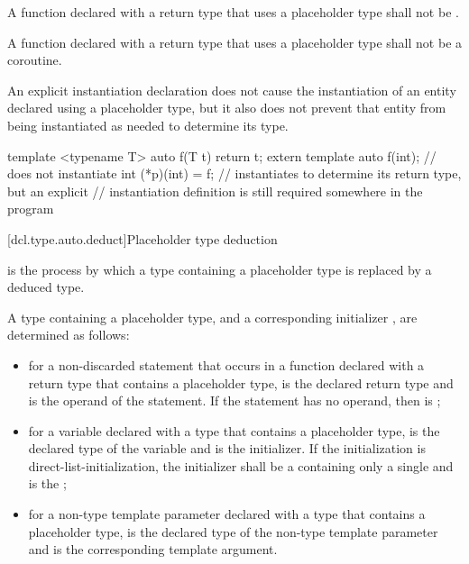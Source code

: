 \pnum
A function declared with a return type that uses a placeholder type shall not
be .

\pnum
A function declared with a return type that uses a placeholder type shall not
be a coroutine.

\pnum
An explicit instantiation declaration does not cause the
instantiation of an entity declared using a placeholder type, but it also does
not prevent that entity from being instantiated as needed to determine its
type.
\begin{example}
\begin{codeblock}
template <typename T> auto f(T t) { return t; }
extern template auto f(int);    // does not instantiate 
int (*p)(int) = f;              // instantiates  to determine its return type, but an explicit
                                // instantiation definition is still required somewhere in the program
\end{codeblock}
\end{example}

[dcl.type.auto.deduct]{Placeholder type deduction}
%

\pnum
{}
is the process by which
a type containing a placeholder type
is replaced by a deduced type.

\pnum
A type  containing a placeholder type,
and a corresponding initializer ,
are determined as follows:

\begin{itemize}
\item
for a non-discarded  statement that occurs
in a function declared with a return type
that contains a placeholder type,
 is the declared return type
and  is the operand of the  statement.
If the  statement
has no operand,
then  is ;
\item
for a variable declared with a type
that contains a placeholder type,
 is the declared type of the variable
and  is the initializer.
If the initialization is direct-list-initialization,
the initializer shall be a 
containing only a single 
and  is the ;
\item
for a non-type template parameter declared with a type
that contains a placeholder type,
 is the declared type of the non-type template parameter
and  is the corresponding template argument.
\end{itemize}

